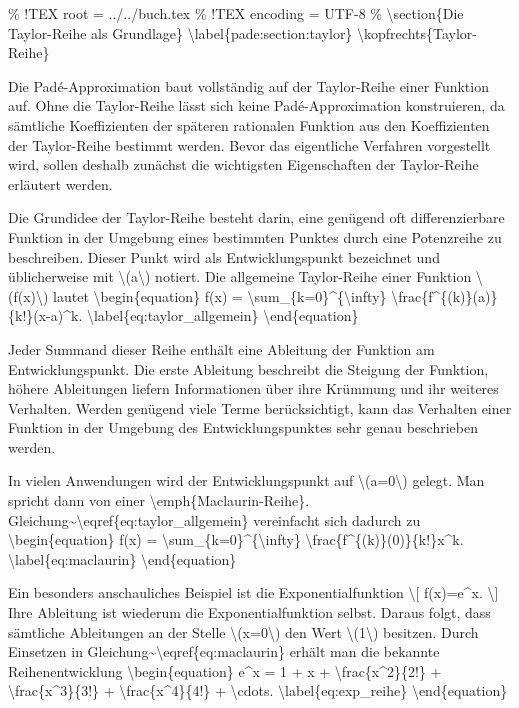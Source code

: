 \% !TEX root = ../../buch.tex \% !TEX encoding = UTF-8 \%
\textbackslash section\{Die Taylor-Reihe als Grundlage\}
\textbackslash label\{pade:section:taylor\}
\textbackslash kopfrechts\{Taylor-Reihe\}

Die Padé-Approximation baut vollständig auf der Taylor-Reihe einer
Funktion auf. Ohne die Taylor-Reihe lässt sich keine Padé-Approximation
konstruieren, da sämtliche Koeffizienten der späteren rationalen
Funktion aus den Koeffizienten der Taylor-Reihe bestimmt werden. Bevor
das eigentliche Verfahren vorgestellt wird, sollen deshalb zunächst die
wichtigsten Eigenschaften der Taylor-Reihe erläutert werden.

Die Grundidee der Taylor-Reihe besteht darin, eine genügend oft
differenzierbare Funktion in der Umgebung eines bestimmten Punktes durch
eine Potenzreihe zu beschreiben. Dieser Punkt wird als Entwicklungspunkt
bezeichnet und üblicherweise mit \textbackslash(a\textbackslash)
notiert. Die allgemeine Taylor-Reihe einer Funktion
\textbackslash(f(x)\textbackslash) lautet
\textbackslash begin\{equation\} f(x) =
\textbackslash sum\_\{k=0\}\^{}\{\textbackslash infty\}
\textbackslash frac\{f\^{}\{(k)\}(a)\}\{k!\}(x-a)\^{}k.
\textbackslash label\{eq:taylor\_allgemein\}
\textbackslash end\{equation\}

Jeder Summand dieser Reihe enthält eine Ableitung der Funktion am
Entwicklungspunkt. Die erste Ableitung beschreibt die Steigung der
Funktion, höhere Ableitungen liefern Informationen über ihre Krümmung
und ihr weiteres Verhalten. Werden genügend viele Terme berücksichtigt,
kann das Verhalten einer Funktion in der Umgebung des
Entwicklungspunktes sehr genau beschrieben werden.

In vielen Anwendungen wird der Entwicklungspunkt auf
\textbackslash(a=0\textbackslash) gelegt. Man spricht dann von einer
\textbackslash emph\{Maclaurin-Reihe\}.
Gleichung\textasciitilde\textbackslash eqref\{eq:taylor\_allgemein\}
vereinfacht sich dadurch zu \textbackslash begin\{equation\} f(x) =
\textbackslash sum\_\{k=0\}\^{}\{\textbackslash infty\}
\textbackslash frac\{f\^{}\{(k)\}(0)\}\{k!\}x\^{}k.
\textbackslash label\{eq:maclaurin\} \textbackslash end\{equation\}

Ein besonders anschauliches Beispiel ist die Exponentialfunktion
\textbackslash{[} f(x)=e\^{}x. \textbackslash{]} Ihre Ableitung ist
wiederum die Exponentialfunktion selbst. Daraus folgt, dass sämtliche
Ableitungen an der Stelle \textbackslash(x=0\textbackslash) den Wert
\textbackslash(1\textbackslash) besitzen. Durch Einsetzen in
Gleichung\textasciitilde\textbackslash eqref\{eq:maclaurin\} erhält man
die bekannte Reihenentwicklung \textbackslash begin\{equation\} e\^{}x =
1 + x + \textbackslash frac\{x\^{}2\}\{2!\} +
\textbackslash frac\{x\^{}3\}\{3!\} +
\textbackslash frac\{x\^{}4\}\{4!\} + \textbackslash cdots.
\textbackslash label\{eq:exp\_reihe\} \textbackslash end\{equation\}

